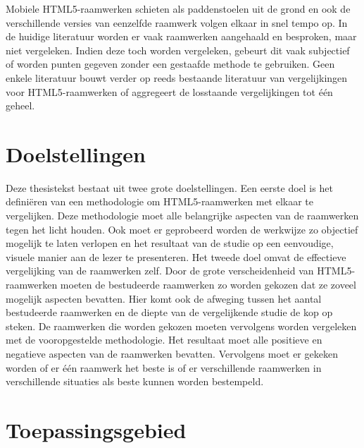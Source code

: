 Mobiele HTML5-raamwerken schieten als paddenstoelen uit de grond en ook de verschillende versies van eenzelfde raamwerk volgen elkaar in snel tempo op.
In de huidige literatuur worden er vaak raamwerken aangehaald en besproken, maar niet vergeleken.
Indien deze toch worden vergeleken, gebeurt dit vaak subjectief of worden punten gegeven zonder een gestaafde methode te gebruiken.
Geen enkele literatuur bouwt verder op reeds bestaande literatuur van vergelijkingen voor HTML5-raamwerken of aggregeert de losstaande vergelijkingen tot één geheel.

\section{Doelstellingen}

Deze thesistekst bestaat uit twee grote doelstellingen.
Een eerste doel is het definiëren van een methodologie om HTML5-raamwerken met elkaar te vergelijken.
Deze methodologie moet alle belangrijke aspecten van de raamwerken tegen het licht houden.
Ook moet er geprobeerd worden de werkwijze zo objectief mogelijk te laten verlopen en het resultaat van de studie op een eenvoudige,  visuele manier aan de lezer te presenteren.
Het tweede doel omvat de effectieve vergelijking van de raamwerken zelf.
Door de grote verscheidenheid van HTML5-raamwerken moeten de bestudeerde raamwerken zo worden gekozen dat ze zoveel mogelijk aspecten bevatten.
Hier komt ook de afweging tussen het aantal bestudeerde raamwerken en de diepte van de vergelijkende studie de kop op steken.
De raamwerken die worden gekozen moeten vervolgens worden vergeleken met de vooropgestelde methodologie.
Het resultaat moet alle positieve en negatieve aspecten van de raamwerken bevatten.
Vervolgens moet er gekeken worden of er één raamwerk het beste is of er verschillende raamwerken in verschillende situaties als beste kunnen worden bestempeld.

\section{Toepassingsgebied}

